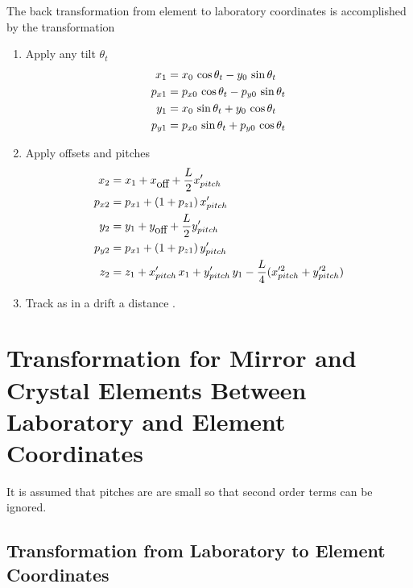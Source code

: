 The back transformation from element to laboratory coordinates is
accomplished by the transformation
\begin{enumerate}
\item
Apply any tilt $\theta_t$
\begin{align}
  x_1    &=  x_0    \, \cos\theta_t - y_0    \, \sin\theta_t \nonumber \\
  p_{x1} &=  p_{x0} \, \cos\theta_t - p_{y0} \, \sin\theta_t \nonumber \\
  y_1    &=  x_0    \, \sin\theta_t + y_0    \, \cos\theta_t \\
  p_{y1} &=  p_{x0} \, \sin\theta_t + p_{y0} \, \cos\theta_t \nonumber
\end{align}
\item
Apply offsets and pitches
\begin{align}
  x_2    &= x_1 + x_{\mbox{off}} + \frac{L}{2} x'_{pitch}     \nonumber \\
  p_{x2} &= p_{x1} + (1 + p_{z1}) \, x'_{pitch}        \nonumber \\
  y_2    &= y_1 + y_{\mbox{off}} + \frac{L}{2} y'_{pitch}     \\
  p_{y2} &= p_{x1} + (1 + p_{z1}) \, y'_{pitch}        \nonumber \\
  z_2    &= z_1 + x'_{pitch} \, x_1 + y'_{pitch} \, y_1 - 
    \frac{L}{4} (x^{\prime2}_{pitch} + y^{\prime2}_{pitch})      \nonumber
\end{align}
\item
Track as in a drift a distance .
\end{enumerate}


\section[Mirror and Crystal Element Transformation]
{Transformation for Mirror and Crystal Elements Between 
Laboratory and Element Coordinates}
\label{s:photon.lab.ele}

It is assumed that pitches are are small so that second
order terms can be ignored.

\subsection{Transformation from Laboratory to Element Coordinates}
\label{ss:crystal.trans.le}


